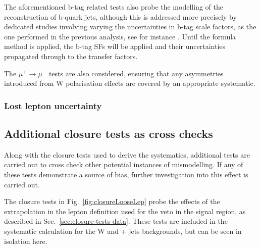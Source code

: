 The aforementioned b-tag related tests also probe the modelling of
the reconstruction of b-quark jets, although this is addressed more
precisely by dedicated studies involving varying the uncertainties in
b-tag scale factors, as the one performed in the previous analysis,
see for instance \cite{CMS_AN_2013-366}. Until the formula method is
applied, the b-tag SFs will be applied and their uncertainties
propagated through to the transfer factors.

The $\mu^{+}\rightarrow\mu^{-}$ tests are also considered, ensuring
that any asymmetries introduced from W polarisation effects are covered by
an appropriate systematic.

\subsubsection{Lost lepton uncertainty}

\subsection{Additional closure tests as cross checks}
\label{sec:closureCrossCheck}

Along with the closure tests used to derive the systematics,
additional tests are carried out to cross check other potential
instances of mismodelling. If any of these tests demonstrate a source
of bias, further investigation into this effect is carried out. 

The closure tests in Fig.~\ref{fig:closureLooseLep} probe the effects
of the extrapolation in the lepton definition used for the veto in the
signal region, as described in Sec.~\ref{sec:closure-tests-data}.
These tests are included in the systematic calculation for the W and
\ttbar + jets backgrounds, but can be seen in isolation here. 

